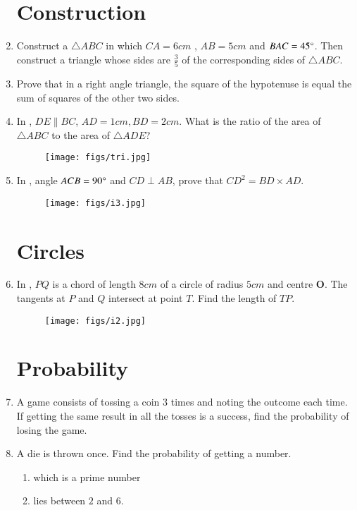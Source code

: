 \documentclass[12pt,-letter paper]{article}
\let\vec\mathbf{}
\let\vec\mathbf{}
\let\vec\mathbf{}
\begin{document}
\begin{enumerate}
\section{Construction}
\item Construct a $\triangle ABC$ in which $CA = 6cm$ , $AB = 5cm$ and $BAC= 45\degree$. Then  construct a triangle whose sides are $\frac{3}{5}$ of the corresponding sides of $\triangle ABC$.
\item Prove that in a right angle triangle, the square of the hypotenuse is equal the sum of squares of the other two sides.
\item In , $DE \parallel BC$, $ AD = 1 cm , BD = 2 cm$. What is the ratio of the area of $\triangle ABC$ to the area of $\triangle ADE$?
\begin{figure}[H]
			\centering
			\texttt{[image: figs/tri.jpg]}
			\caption{}
			\label{fig:figure1}
			
			
		\end{figure} 
\item In , angle $ACB = 90\degree$ and $CD \perp AB$, prove that $CD ^ 2 = BD \times AD$.
\begin{figure}[H]                                                            \centering
                        \texttt{[image: figs/i3.jpg]}
			\caption{}
			\label{fig:figure3}
                \end{figure}
\section{Circles}
\item In , $PQ$ is a chord of length $8 cm$ of a circle of radius $5 cm$ and centre $\vec{O}$. The tangents at $P$ and $Q$ intersect at point $T$. Find the length of $TP$.
\begin{figure}[H]                                             \centering
         \texttt{[image: figs/i2.jpg]}
			\caption{}
			\label{fig:figure2}

                \end{figure}

\section{Probability}

\item A game consists of tossing a coin $3$ times and noting the outcome each time. If getting the same result in all the tosses is a success, find the probability of losing the game.
\item A die is thrown once. Find the probability of getting a number.
\begin{enumerate}[label={\Roman*.}]
\item which is a prime number
\item lies between $2$ and $6$.
\end{enumerate}
\end{enumerate}
\end{document}

